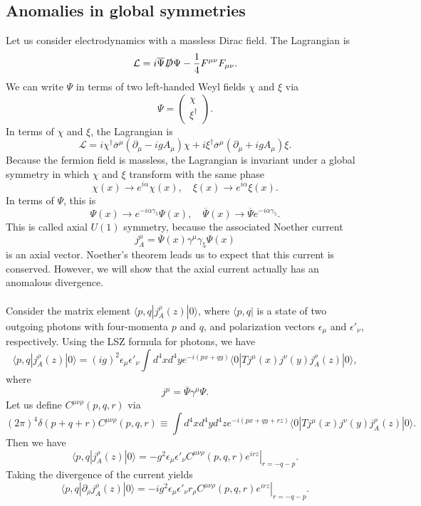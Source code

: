 \subsection{Anomalies in global symmetries}
Let us consider electrodynamics with a massless Dirac field. The Lagrangian is
\[\mathcal{L} = i\overline{\Psi}\slashed{D}\Psi - \frac{1}{4}F^{\mu\nu}F_{\mu\nu}.\]
We can write $\Psi$ in terms of two left-handed Weyl fields $\chi$ and $\xi$ via
\[\Psi = \begin{pmatrix}
\chi \\ \xi^{\dagger}
\end{pmatrix}.\]
In terms of $\chi$ and $\xi$, the Lagrangian is
\[\mathcal{L} = i\chi^{\dagger}\overline{\sigma}^{\mu} (\partial_{\mu} - igA_{\mu})\chi + i\xi^{\dagger}\overline{\sigma}^{\mu} (\partial_{\mu} + igA_{\mu})\xi.\]
Because the fermion field is massless, the Lagrangian is  invariant under a global symmetry in which $\chi$ and $\xi$ transform with the same phase
\[\chi(x) \to e^{i\alpha}\chi(x) , \quad \xi(x) \to e^{i\alpha}\xi(x).\]
In terms of $\Psi$, this is
\[\Psi(x) \to e^{-i\alpha\gamma_5}\Psi(x) , \quad \overline{\Psi}(x) \to \overline{\Psi} e^{-i\alpha\gamma_5}.\]
This is called axial $U(1)$ symmetry, because the associated Noether current
\[j^{\mu}_A = \overline{\Psi}(x) \gamma^{\mu} \gamma_5 \Psi(x)\]
is an axial vector. Noether's theorem leads us to expect that this current is conserved. However, we will show that the axial current actually has an anomalous divergence.
\\ \\
Consider the matrix element $\langle p,q | j^{\rho}_A(z) |  0 \rangle$, where $\langle p,q |$ is a state of two outgoing photons with four-momenta $p$ and $q$, and polarization vectors $\epsilon_{\mu}$ and $\epsilon'_{\nu}$, respectively. Using the LSZ formula for photons, we have
\[\langle p,q | j^{\rho}_A(z) |  0 \rangle = (ig)^2 \epsilon_{\mu} \epsilon'_{\nu} \int d^4x d^4y e^{-i(px+qy)} \langle 0 | T j^{\mu}(x) j^{\nu}(y) j^{\rho}_A(z) | 0 \rangle ,\]
where
\[j^{\mu} = \overline{\Psi}\gamma^{\mu}\Psi.\]
Let us define $C^{\mu\nu\rho}(p,q,r)$ via
\[(2\pi)^4 \delta(p+q+r)C^{\mu\nu\rho}(p,q,r) \equiv  \int d^4x d^4y d^4z e^{-i(px+qy+rz)} \langle 0 | T j^{\mu}(x) j^{\nu}(y) j^{\rho}_A(z) | 0 \rangle.\]
Then we have
\[\langle p,q | j^{\rho}_A(z) |  0 \rangle = -g^2 \epsilon_{\mu} \epsilon'_{\nu} \left. C^{\mu\nu\rho}(p,q,r) e^{irz} \right|_{r=-q-p}.\]
Taking the divergence of the current yields
\[\langle p,q | \partial_{\rho} j^{\rho}_A(z) |  0 \rangle = -ig^2 \epsilon_{\mu} \epsilon'_{\nu} r_{\rho} \left. C^{\mu\nu\rho}(p,q,r) e^{irz} \right|_{r=-q-p}.\]
